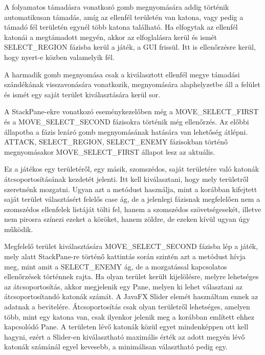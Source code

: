 A folyamatos támadásra vonatkozó gomb megnyomására addig történik automatikusan támadás, amíg az ellenfél területén van katona, vagy pedig a támadó fél területén egynél több katona található. Ha elfogytak az ellenfél katonái a megtámadott megyén, akkor az elfoglalásra kerül és ismét SELECT\_REGION fázisba kerül a játék, a GUI frissül. Itt is ellenőrzésre kerül, hogy nyert-e közben valamelyik fél. 

A harmadik gomb megnyomása csak a kiválasztott ellenfél megye támadási szándékának visszavonására vonatkozik, megnyomására alaphelyzetbe áll a felület és ismét egy saját terület kiválasztására kerül sor. 

A StackPane-ekre vonatkozó eseménykezelőben még a MOVE\_SELECT\_FIRST és a MOVE\_SELECT\_SECOND fázisokra történik még ellenőrzés. Az előbbi állapotba a fázis lezáró gomb megnyomásának hatására van lehetőség átlépni. ATTACK, SELECT\_REGION, SELECT\_ENEMY fázisokban történő megnyomásakor MOVE\_SELECT\_FIRST állapot lesz az aktuális. 

Ez a játékos egy területéről, egy másik, szomszédos, saját területére való katonák átcsoportosításának kezdetét jelenti. Itt kell kiválasztani, hogy mely területről szeretnénk mozgatni. Ugyan azt a metódust használja, mint a korábban kifejtett saját terület választásért felelős case ág, de a jelenlegi fázisnak megfelelően nem a szomszédos ellenfelek listáját tölti fel, hanem a szomszédos szövetségesekét, illetve nem pirosra színezi ezeket a köröket, hanem zöldre, de ezeken kívül ugyan úgy működik. 

Megfelelő terület kiválasztására MOVE\_SELECT\_SECOND fázisba lép a játék, mely alatt StackPane-re történő kattintás során szintén azt a metódust hívja meg, mint amit a SELECT\_ENEMY ág, de a mozgatással kapcsolatos ellenőrzések történnek rajta. Ha olyan terület került kijelölésre, melyre lehetséges az átcsoportosítás, akkor megjelenik egy Pane, melyen ki lehet választani az átcsoportosítandó katonák számát. A JavaFX Slider elemét használtam ennek az adatnak a bevitelére. Átcsoportosítás csak olyan területről lehetséges, amelyen több, mint egy katona van, csak ilyenkor jelenik meg a korábban említett ehhez kapcsolódó Pane. A területen lévő katonák közül egyet mindenképpen ott kell hagyni, ezért a Slider-en kiválasztható maximális érték az adott megyén lévő katonák számánál egyel kevesebb, a minimálisan választható pedig egy. 

